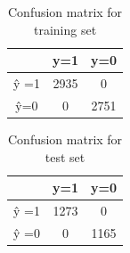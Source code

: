 \documentclass[]{article}
\begin{document}
\begin{table}[h]
    \centering
    \begin{tabular}{|c|c|c|} \hline 
         &  y=1& y=0\\ \hline 
          ŷ =1&  2935& 0\\ \hline 
           ŷ=0&  0& 2751\\ \hline
    \end{tabular}
    \caption{Confusion matrix for training set}
    \label{tab:my_label}
\end{table}
 
 \begin{table}[h]
     \centering
     \begin{tabular}{|c|c|c|} \hline 
          &  y=1& y=0\\ \hline 
          ŷ =1&  1273& 0\\ \hline 
          ŷ =0&  0& 1165\\ \hline
     \end{tabular}
     \caption{Confusion matrix for test set}
     \label{tab:my_label}
 \end{table}
\end{document}
